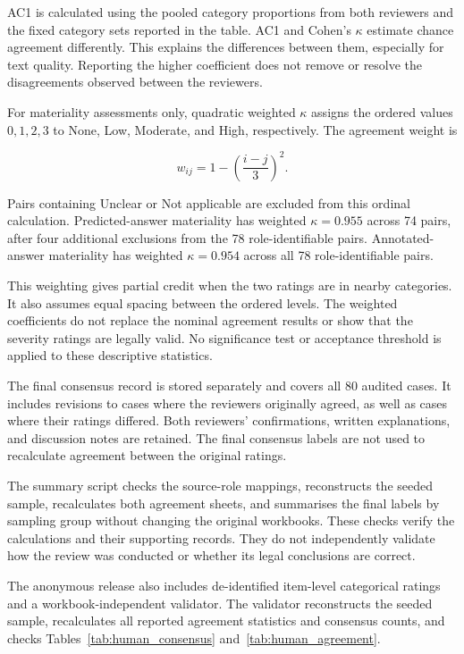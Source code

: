 \documentclass[pdflatex,sn-basic]{sn-jnl}%
\theoremstyle{thmstyleone}%
\theoremstyle{thmstyletwo}%
\theoremstyle{thmstylethree}%
\begin{document}
AC1 is calculated using the pooled category proportions from both reviewers
and the fixed category sets reported in the table. AC1 and Cohen's $\kappa$
estimate chance agreement differently. This explains the differences between
them, especially for text quality. Reporting the higher coefficient does not
remove or resolve the disagreements observed between the reviewers.

For materiality assessments only, quadratic weighted $\kappa$ assigns the
ordered values $0,1,2,3$ to None, Low, Moderate, and High, respectively. The
agreement weight is

\[
w_{ij}=1-\left(\frac{i-j}{3}\right)^2.
\]

Pairs containing Unclear or Not applicable are excluded from this ordinal
calculation. Predicted-answer materiality has weighted $\kappa=0.955$ across
74 pairs, after four additional exclusions from the 78 role-identifiable
pairs. Annotated-answer materiality has weighted $\kappa=0.954$ across all
78 role-identifiable pairs.

This weighting gives partial credit when the two ratings are in nearby
categories. It also assumes equal spacing between the ordered levels. The
weighted coefficients do not replace the nominal agreement results or show
that the severity ratings are legally valid. No significance test or
acceptance threshold is applied to these descriptive statistics.

The final consensus record is stored separately and covers all 80 audited
cases. It includes revisions to cases where the reviewers originally agreed,
as well as cases where their ratings differed. Both reviewers' confirmations,
written explanations, and discussion notes are retained. The final consensus
labels are not used to recalculate agreement between the original ratings.

The summary script checks the source-role mappings, reconstructs the seeded
sample, recalculates both agreement sheets, and summarises the final labels by
sampling group without changing the original workbooks. These checks verify
the calculations and their supporting records. They do not independently
validate how the review was conducted or whether its legal conclusions are
correct.

The anonymous release also includes de-identified item-level categorical
ratings and a workbook-independent validator. The validator reconstructs the
seeded sample, recalculates all reported agreement statistics and consensus
counts, and checks Tables~\ref{tab:human_consensus}
and~\ref{tab:human_agreement}.
\end{document}
